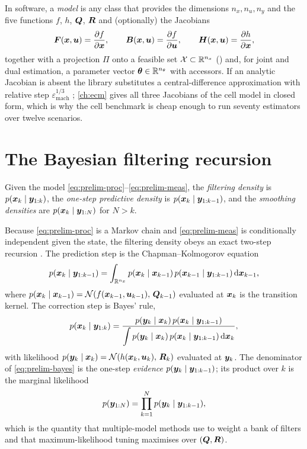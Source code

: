 In software, a \emph{model} is any class that provides the dimensions $n_x, n_u, n_y$ and the
five functions $f$, $h$, $\bm{Q}$, $\bm{R}$ and (optionally) the Jacobians
\begin{equation}
\bm{F}(\bm{x},\bm{u}) = \frac{\partial f}{\partial \bm{x}},\qquad
\bm{B}(\bm{x},\bm{u}) = \frac{\partial f}{\partial \bm{u}},\qquad
\bm{H}(\bm{x},\bm{u}) = \frac{\partial h}{\partial \bm{x}},
\label{eq:prelim-jac}
\end{equation}
together with a projection $\Pi$ onto a feasible set $\mathcal{X}\subset\mathbb{R}^{n_x}$
() and, for joint and dual estimation, a parameter vector
$\bm{\theta}\in\mathbb{R}^{n_\theta}$ with accessors. If an analytic Jacobian is absent the library
substitutes a central-difference approximation with relative step
$\varepsilon_{\mathrm{mach}}^{1/3}$ \cite[\S 5]{golubvanloan2013}; \cref{ch:ecm} gives all three
Jacobians of the cell model in closed form, which is why the cell benchmark is cheap enough to
run seventy estimators over twelve scenarios.

\section{The Bayesian filtering recursion}
\label{sec:prelim-bayes}

\begin{definition}\label{def:prelim-densities}
Given the model \eqref{eq:prelim-proc}--\eqref{eq:prelim-meas}, the \emph{filtering density} is
$p(\bm{x}_k\mid\bm{y}_{1:k})$, the \emph{one-step predictive density} is $p(\bm{x}_k\mid\bm{y}_{1:k-1})$, and
the \emph{smoothing densities} are $p(\bm{x}_k\mid\bm{y}_{1:N})$ for $N>k$.
\end{definition}

Because \eqref{eq:prelim-proc} is a Markov chain and \eqref{eq:prelim-meas} is conditionally
independent given the state, the filtering density obeys an exact two-step recursion
\cite{stratonovich1960,holee1964,jazwinski1970}. The prediction step is the
Chapman--Kolmogorov equation
\begin{equation}
p(\bm{x}_k\mid\bm{y}_{1:k-1}) = \int_{\mathbb{R}^{n_x}} p(\bm{x}_k\mid\bm{x}_{k-1})\,p(\bm{x}_{k-1}\mid\bm{y}_{1:k-1})\,
  \mathrm{d}\bm{x}_{k-1},
\label{eq:prelim-ck}
\end{equation}
where $p(\bm{x}_k\mid\bm{x}_{k-1}) = \mathcal{N}\!\left(f(\bm{x}_{k-1},\bm{u}_{k-1}),\,\bm{Q}_{k-1}\right)$ evaluated at $\bm{x}_k$ is the
transition kernel. The correction step is Bayes' rule,
\begin{equation}
p(\bm{x}_k\mid\bm{y}_{1:k}) = \frac{p(\bm{y}_k\mid\bm{x}_k)\,p(\bm{x}_k\mid\bm{y}_{1:k-1})}
 {\displaystyle\int p(\bm{y}_k\mid\bm{x}_k)\,p(\bm{x}_k\mid\bm{y}_{1:k-1})\,\mathrm{d}\bm{x}_k},
\label{eq:prelim-bayes}
\end{equation}
with likelihood $p(\bm{y}_k\mid\bm{x}_k) = \mathcal{N}\!\left(h(\bm{x}_k,\bm{u}_k),\,\bm{R}_k\right)$ evaluated at $\bm{y}_k$. The
denominator of \eqref{eq:prelim-bayes} is the one-step \emph{evidence} $p(\bm{y}_k\mid\bm{y}_{1:k-1})$;
its product over $k$ is the marginal likelihood
\begin{equation}
p(\bm{y}_{1:N}) = \prod_{k=1}^{N} p(\bm{y}_k\mid\bm{y}_{1:k-1}),
\label{eq:prelim-evidence}
\end{equation}
which is the quantity that multiple-model methods use to weight a bank of filters and that
maximum-likelihood tuning maximises over $(\bm{Q},\bm{R})$.

